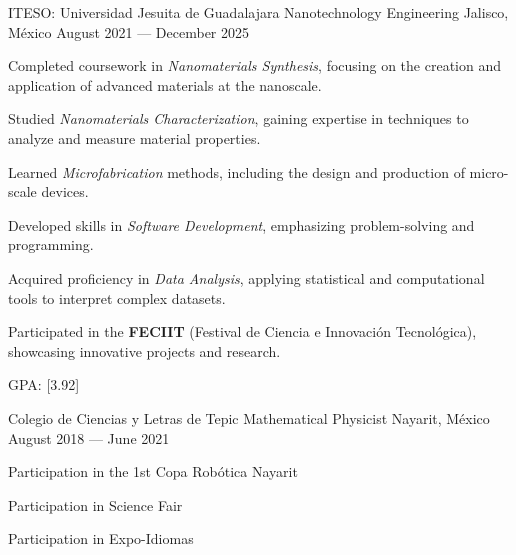 {}
\begin{cventries}
  \cventry
  {ITESO\@: Universidad Jesuita de Guadalajara}
  {Nanotechnology Engineering}
  {Jalisco, México}
  {August 2021 --- December 2025}
  {
    \begin{cvitems}
      \item {Completed coursework in \textit{Nanomaterials Synthesis}, focusing on the creation and application of advanced materials at the nanoscale.}
      \item {Studied \textit{Nanomaterials Characterization}, gaining expertise in techniques to analyze and measure material properties.}
      \item {Learned \textit{Microfabrication} methods, including the design and production of micro-scale devices.}
      \item {Developed skills in \textit{Software Development}, emphasizing problem-solving and programming.}
      \item {Acquired proficiency in \textit{Data Analysis}, applying statistical and computational tools to interpret complex datasets.}
      \item {Participated in the \textbf{FECIIT} (Festival de Ciencia e Innovación Tecnológica), showcasing innovative projects and research.}
      \item {GPA: [3.92]}
    \end{cvitems}
  }

  \cventry
  {Colegio de Ciencias y Letras de Tepic}
  {Mathematical Physicist}
  {Nayarit, México}
  {August 2018 --- June 2021}
  {
    \begin{cvitems}
      \item {Participation in the 1st Copa Robótica Nayarit}
      \item {Participation in Science Fair}
      \item {Participation in Expo-Idiomas}
    \end{cvitems}
  }
\end{cventries}